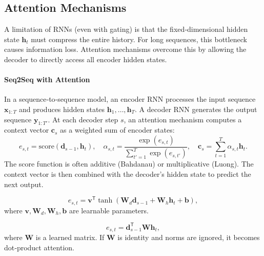 \documentclass{tufte-handout}
\begin{document}
\subsection{Attention Mechanisms}

A limitation of RNNs (even with gating) is that the fixed‑dimensional hidden state $\mathbf{h}_t$ must compress the entire history. For long sequences, this bottleneck causes information loss. Attention mechanisms overcome this by allowing the decoder to directly access all encoder hidden states.

\paragraph{Seq2Seq with Attention}
In a sequence‑to‑sequence model, an encoder RNN processes the input sequence $\mathbf{x}_{1:T}$ and produces hidden states $\mathbf{h}_1,\dots,\mathbf{h}_T$. A decoder RNN generates the output sequence $\mathbf{y}_{1:T'}$. At each decoder step $s$, an attention mechanism computes a context vector $\mathbf{c}_s$ as a weighted sum of encoder states:
\[
e_{s,t} = \text{score}(\mathbf{d}_{s-1}, \mathbf{h}_t),\quad
\alpha_{s,t} = \frac{\exp(e_{s,t})}{\sum_{t'=1}^T \exp(e_{s,t'})},\quad
\mathbf{c}_s = \sum_{t=1}^T \alpha_{s,t} \mathbf{h}_t.
\]
The score function is often additive (Bahdanau) or multiplicative (Luong). The context vector is then combined with the decoder’s hidden state to predict the next output.

\begin{defn}
    \[
    e_{s,t} = \mathbf{v}^{\mathsf{T}} \tanh(\mathbf{W}_d \mathbf{d}_{s-1} + \mathbf{W}_h \mathbf{h}_t + \mathbf{b}),
    \]
    where $\mathbf{v}, \mathbf{W}_d, \mathbf{W}_h, \mathbf{b}$ are learnable parameters.
\end{defn}

\begin{defn}
    \[
    e_{s,t} = \mathbf{d}_{s-1}^{\mathsf{T}} \mathbf{W} \mathbf{h}_t,
    \]
    where $\mathbf{W}$ is a learned matrix. If $\mathbf{W}$ is identity and norms are ignored, it becomes dot‑product attention.
\end{defn}

\begin{marginfigure}
\centering
{}
\caption{Attention aligns decoder state $\mathbf{d}_{s-1}$ with encoder states $\mathbf{h}_t$ to form a context vector.}
\end{marginfigure}
\end{document}

